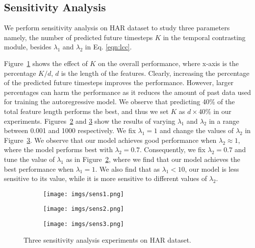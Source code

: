 \documentclass{article}
\begin{document}
\subsection{Sensitivity Analysis}
\label{sec:sens_analysis}
We perform sensitivity analysis on HAR dataset to study three parameters namely, the number of predicted future timesteps $K$ in the temporal contrasting module, besides $\lambda_1$ and $\lambda_2$ in Eq. \ref{eqn:lcc}.

Figure~\ref{fig:sens1} shows the effect of $K$ on the overall performance, where x-axis is the percentage $K/d$, $d$ is the length of the features. Clearly, increasing the percentage of the predicted future timesteps improves the performance. However, larger percentages can harm the performance as it reduces the amount of past data used for training the autoregressive model. We observe that predicting 40\% of the total feature length performs the best, and thus we set $K$ as $d\times$40\% in our experiments. Figures~\ref{fig:sens2} and \ref{fig:sens3} show the results of varying $\lambda_1$ and $\lambda_2$ in a range between 0.001 and 1000 respectively. We fix $\lambda_1=1$ and change the values of $\lambda_2$ in Figure~\ref{fig:sens3}. We observe that our model achieves good performance when $\lambda_2 \approx 1$, where the model performs best with $\lambda_2=0.7$. 
Consequently, we fix $\lambda_2=0.7$ and tune the value of $\lambda_1$ as in Figure~\ref{fig:sens2}, where we find that our model achieves the best performance when $\lambda_1=1$. We also find that as $\lambda_1<10$, our model is less sensitive to its value, while it is more sensitive to different values of $\lambda_2$.





\begin{figure*}
     \centering
     \begin{subfigure}[b]{0.3\textwidth}
         \centering
         \texttt{[image: imgs/sens1.png]}
         \caption{}
         \label{fig:sens1}
     \end{subfigure}
     \hfill
     \begin{subfigure}[b]{0.3\textwidth}
         \centering
         \texttt{[image: imgs/sens2.png]}
         \caption{}
         \label{fig:sens2}
     \end{subfigure}
     \hfill
     \begin{subfigure}[b]{0.3\textwidth}
         \centering
         \texttt{[image: imgs/sens3.png]}
         \caption{}
         \label{fig:sens3}
     \end{subfigure}
        \caption{Three sensitivity analysis experiments on HAR dataset.}
        \label{Fig:ts_sens_analysis}
\end{figure*}
\end{document}
